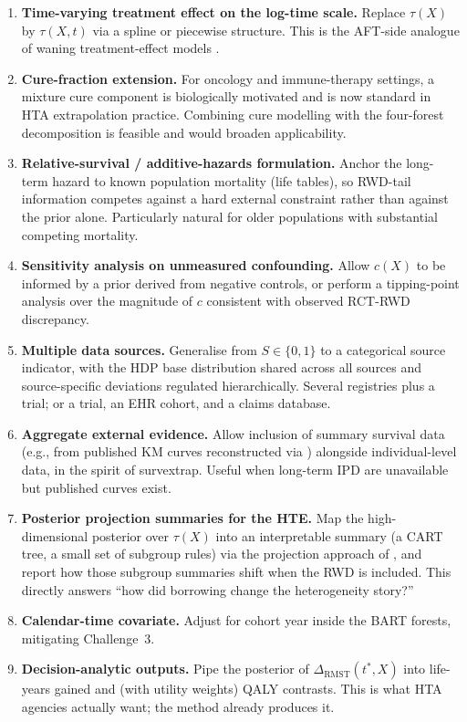 \documentclass[11pt]{article}
\newcommand{\X}{X}
\newcommand{\Sx}{S}
\newcommand{\tauf}{\tau}
\newcommand{\cf}{c}
\newcommand{\RMST}{\mathrm{RMST}}
\begin{document}
\begin{enumerate}[label=(E\arabic*), leftmargin=*]
  \item \textbf{Time-varying treatment effect on the log-time scale.}
        Replace $\tauf(\X)$ by $\tauf(\X, t)$ via a spline or piecewise
        structure. This is the AFT-side analogue of waning treatment-effect
        models \citep{Jackson2023}.
  \item \textbf{Cure-fraction extension.}
        For oncology and immune-therapy settings, a mixture cure component
        is biologically motivated and is now standard in HTA extrapolation
        practice. Combining cure modelling with the four-forest decomposition
        is feasible and would broaden applicability.
  \item \textbf{Relative-survival / additive-hazards formulation.}
        Anchor the long-term hazard to known population mortality (life
        tables), so RWD-tail information competes against a hard external
        constraint rather than against the prior alone. Particularly natural
        for older populations with substantial competing mortality.
  \item \textbf{Sensitivity analysis on unmeasured confounding.}
        Allow $\cf(\X)$ to be informed by a prior derived from negative
        controls, or perform a tipping-point analysis over the magnitude of
        $\cf$ consistent with observed RCT-RWD discrepancy.
  \item \textbf{Multiple data sources.}
        Generalise from $\Sx \in \{0,1\}$ to a categorical source indicator,
        with the HDP base distribution shared across all sources and
        source-specific deviations regulated hierarchically. Several
        registries plus a trial; or a trial, an EHR cohort, and a claims
        database.
  \item \textbf{Aggregate external evidence.}
        Allow inclusion of summary survival data (e.g., from published KM
        curves reconstructed via \citet{Guyot2012}) alongside individual-level
        data, in the spirit of survextrap. Useful when long-term IPD are
        unavailable but published curves exist.
  \item \textbf{Posterior projection summaries for the HTE.}
        Map the high-dimensional posterior over $\tauf(\X)$ into an
        interpretable summary (a CART tree, a small set of subgroup rules)
        via the projection approach of \citet{Woody2020}, and report
        how those subgroup summaries shift when the RWD is included.
        This directly answers ``how did borrowing change the
        heterogeneity story?''
  \item \textbf{Calendar-time covariate.}
        Adjust for cohort year inside the BART forests, mitigating
        Challenge~3.
  \item \textbf{Decision-analytic outputs.}
        Pipe the posterior of $\Delta_{\RMST}(t^*, \X)$ into life-years
        gained and (with utility weights) QALY contrasts. This is what HTA
        agencies actually want; the method already produces it.
\end{enumerate}
\end{document}
